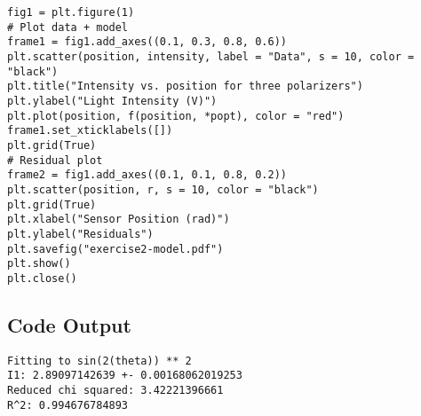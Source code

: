 \begin{lstlisting}
fig1 = plt.figure(1)
# Plot data + model
frame1 = fig1.add_axes((0.1, 0.3, 0.8, 0.6))
plt.scatter(position, intensity, label = "Data", s = 10, color = "black")
plt.title("Intensity vs. position for three polarizers")
plt.ylabel("Light Intensity (V)")
plt.plot(position, f(position, *popt), color = "red")
frame1.set_xticklabels([])
plt.grid(True)
# Residual plot
frame2 = fig1.add_axes((0.1, 0.1, 0.8, 0.2))
plt.scatter(position, r, s = 10, color = "black")
plt.grid(True)
plt.xlabel("Sensor Position (rad)")
plt.ylabel("Residuals")
plt.savefig("exercise2-model.pdf")
plt.show()
plt.close()
\end{lstlisting}

\subsection*{Code Output}
\begin{lstlisting}
Fitting to sin(2(theta)) ** 2
I1: 2.89097142639 +- 0.00168062019253
Reduced chi squared: 3.42221396661
R^2: 0.994676784893
\end{lstlisting}\vfill\pagebreak
